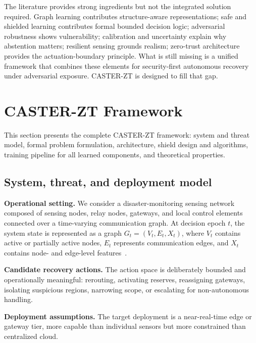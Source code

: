 \documentclass[10pt,journal,compsoc]{IEEEtran}
\begin{document}
The literature provides strong ingredients but not the integrated solution required.
Graph learning contributes structure-aware representations; safe and shielded learning contributes formal bounded decision logic; adversarial robustness shows vulnerability; calibration and uncertainty explain why abstention matters; resilient sensing grounds realism; zero-trust architecture provides the actuation-boundary principle.
What is still missing is a unified framework that combines these elements for security-first autonomous recovery under adversarial exposure.
CASTER-ZT is designed to fill that gap.


\section{CASTER-ZT Framework}
\label{sec:framework}

This section presents the complete CASTER-ZT framework: system and threat model, formal problem formulation, architecture, shield design and algorithms, training pipeline for all learned components, and theoretical properties.

\subsection{System, threat, and deployment model}

\noindent\textbf{Operational setting.}
We consider a disaster-monitoring sensing network composed of sensing nodes, relay nodes, gateways, and local control elements connected over a time-varying communication graph.
At decision epoch $t$, the system state is represented as a graph $G_t=(V_t,E_t,X_t)$, where $V_t$ contains active or partially active nodes, $E_t$ represents communication edges, and $X_t$ contains node- and edge-level features~\cite{sensorscope2008,intel_lab_data_2004}.

\noindent\textbf{Candidate recovery actions.}
The action space is deliberately bounded and operationally meaningful: rerouting, activating reserves, reassigning gateways, isolating suspicious regions, narrowing scope, or escalating for non-autonomous handling.

\noindent\textbf{Deployment assumptions.}
The target deployment is a near-real-time edge or gateway tier, more capable than individual sensors but more constrained than centralized cloud.
\end{document}
